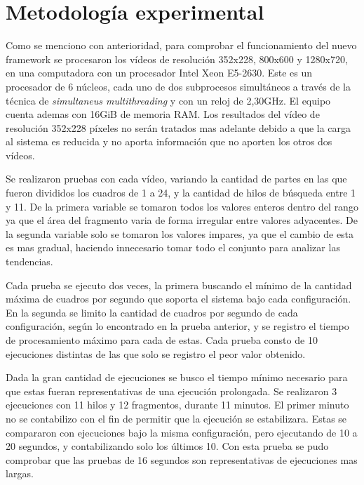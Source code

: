 
\section{Metodología experimental}

Como se menciono con anterioridad, para comprobar el funcionamiento del nuevo
framework se procesaron los vídeos de resolución 352x228, 800x600 y 1280x720, en
una computadora con un procesador Intel Xeon E5-2630. Este es un procesador de 6
núcleos, cada uno de dos subprocesos simultáneos a través de la técnica de
\emph{simultaneus multithreading} y con un reloj de 2,30GHz. El equipo cuenta
ademas con 16GiB de memoria RAM. Los resultados del vídeo de resolución 352x228
píxeles no serán tratados mas adelante debido a que la carga al sistema es
reducida y no aporta información que no aporten los otros dos vídeos.

Se realizaron pruebas con cada vídeo, variando la cantidad de partes en las que
fueron divididos los cuadros de 1 a 24, y la cantidad de hilos de búsqueda entre
1 y 11. De la primera variable se tomaron todos los valores enteros dentro del
rango ya que el área del fragmento varia de forma irregular entre valores
adyacentes. De la segunda variable solo se tomaron los valores impares, ya que
el cambio de esta es mas gradual, haciendo innecesario tomar todo el conjunto
para analizar las tendencias.

Cada prueba se ejecuto dos veces, la primera buscando el mínimo de la cantidad
máxima de cuadros por segundo que soporta el sistema bajo cada configuración. En
la segunda se limito la cantidad de cuadros por segundo de cada configuración,
según lo encontrado en la prueba anterior, y se registro el tiempo de
procesamiento máximo para cada de estas. Cada prueba consto de 10 ejecuciones
distintas de las que solo se registro el peor valor obtenido.

Dada la gran cantidad de ejecuciones se busco el tiempo mínimo necesario para
que estas fueran representativas de una ejecución prolongada. Se realizaron 3
ejecuciones con 11 hilos y 12 fragmentos, durante 11 minutos. El primer minuto
no se contabilizo con el fin de permitir que la ejecución se estabilizara.
Estas se compararon con ejecuciones bajo la misma configuración, pero ejecutando
de 10 a 20 segundos, y contabilizando solo los últimos 10. Con esta prueba se
pudo comprobar que las pruebas de 16 segundos son representativas de ejecuciones
mas largas.

